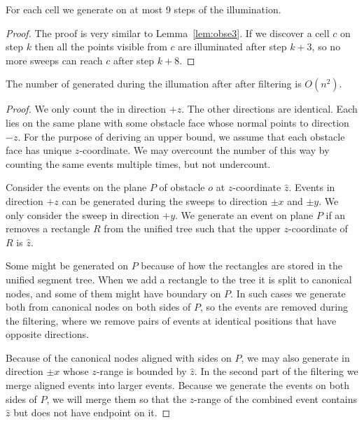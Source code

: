 \documentclass[english,gradu]{tktltiki2018}
\begin{document}
\begin{lem}\label{lem:celle3}For each cell we generate \cellE on at most 9 steps of the illumination.\end{lem}
\begin{proof}
The proof is very similar to Lemma~\ref{lem:obse3}.
If we discover a cell $c$ on step $k$ then all the points visible from $c$ are illuminated after step $k+3$, so no more sweeps can reach $c$ after step $k+8$.
\end{proof}

\begin{lem}\label{lem:adde3}The number of \addEs generated during the illumation after after filtering is $O(n^2)$.\end{lem}
\begin{proof}
We only count the \addEs in direction $+z$.
The other directions are identical.
Each \addE lies on the same plane with some obstacle face whose normal points to direction $-z$.
For the purpose of deriving an upper bound, we assume that each obstacle face has unique $z$-coordinate.
We may overcount the number of \addEs this way by counting the same events multiple times, but not undercount.

Consider the events on the plane $P$ of obstacle $o$ at $z$-coordinate $\hat{z}$.
Events in direction $+z$ can be generated during the sweeps to direction $\pm x$ and $\pm y$.
We only consider the sweep in direction $+y$.
We generate an event on plane $P$ if an \obsE removes a rectangle $R$ from the unified tree such that the upper $z$-coordinate of $R$ is $\hat{z}$.

Some \addEs might be generated on $P$ because of how the rectangles are stored in the unified segment tree.
When we add a rectangle to the tree it is split to canonical nodes, and some of them might have boundary on $P$.
In such cases we generate \addEs both from canonical nodes on both sides of $P$, so the events are removed during the filtering, where we remove pairs of events at identical positions that have opposite directions.

Because of the canonical nodes aligned with sides on $P$, we may also generate \addEs in direction $\pm x$ whose $z$-range is bounded by $\hat{z}$.
In the second part of the filtering we merge aligned events into larger events.
Because we generate the events on both sides of $P$, we will merge them so that the $z$-range of the combined event contains $\hat{z}$ but does not have endpoint on it.


\end{proof}
\end{document}
